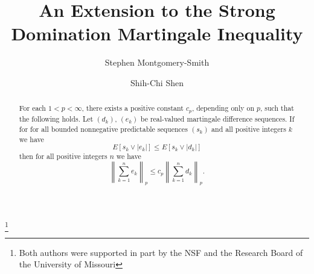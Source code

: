 \documentclass[12pt]{amsart}
\begin{document}
\title[Extension to a Martingale Inequality]{An Extension to the
Strong Domination Martingale Inequality}
\author{Stephen Montgomery-Smith}
\address{Department of Mathematics\\
University of Missouri\\
Columbia, Missouri 65211, USA.}
\author{ Shih-Chi Shen }
\address{Department of Mathematics\\
University of Missouri\\
Columbia, Missouri 65211, USA.}
\thanks{Both authors were supported in part by the NSF
and the Research Board of the University of Missouri}

\begin{abstract}
For each $1<p<\infty$, there exists a positive constant $c_p$,
depending only on $p$, such
that the following holds.  Let $(d_k)$, $(e_k)$ be real-valued martingale
difference sequences. If for for all bounded nonnegative predictable
sequences $(s_k)$ and all positive integers $k$ we have
\[E[s_k \vee |e_k|]\leq E[s_k \vee |d_k|]\]
then for all positive integers $n$ we have
\[ \left\| \sum_{k=1}^n e_k \right\|_p
\leq  c_p \left\| \sum_{k=1}^n d_k \right\|_p .\]
\end{abstract}
\maketitle
\end{document}
